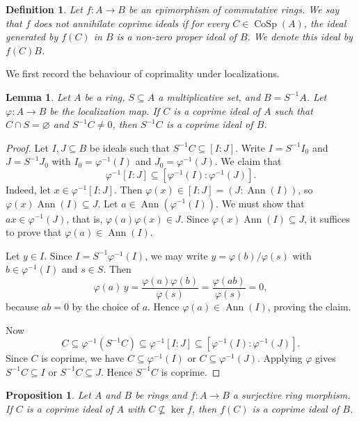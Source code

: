 \documentclass{amsart}
\newtheorem{lemma}{Lemma}
\newtheorem{proposition}{Proposition}
\newtheorem{definition}{Definition}
\DeclareMathOperator{\ann}{Ann}
\begin{document}
\begin{definition}\label{def:non-annihilating-epi}
Let $f\colon A\to B$ be an epimorphism of commutative rings. We say that $f$ \emph{does not annihilate coprime ideals} if for every $C\in\operatorname{CoSp}(A)$, the ideal generated by $f(C)$ in $B$ is a non-zero proper ideal of $B$. We denote this ideal by $f(C)B$.
\end{definition}

 

We first record the behaviour of coprimality under localizations.

\begin{lemma}\label{lem:localization-coprime}
Let $A$ be a ring, $S\subseteq A$ a multiplicative set, and $B=S^{-1}A$. Let $\varphi\colon A\to B$ be the localization map. If $C$ is a coprime ideal of $A$ such that $C\cap S=\varnothing$ and $S^{-1}C\neq 0$, then $S^{-1}C$ is a coprime ideal of $B$.
\end{lemma}

\begin{proof}
Let $I,J\subseteq B$ be ideals such that $S^{-1}C\subseteq [I:J]$. Write $I=S^{-1}I_0$ and $J=S^{-1}J_0$ with $I_0=\varphi^{-1}(I)$ and $J_0=\varphi^{-1}(J)$. We claim that
\[
\varphi^{-1}[I:J]\subseteq [\varphi^{-1}(I):\varphi^{-1}(J)].
\]
Indeed, let $x\in \varphi^{-1}[I:J]$. Then $\varphi(x)\in [I:J]=(J:\ann(I))$, so $\varphi(x)\ann(I)\subseteq J$. Let $a\in \ann(\varphi^{-1}(I))$. We must show that $ax\in \varphi^{-1}(J)$, that is, $\varphi(a)\varphi(x)\in J$. Since $\varphi(x)\ann(I)\subseteq J$, it suffices to prove that $\varphi(a)\in \ann(I)$.

Let $y\in I$. Since $I=S^{-1}\varphi^{-1}(I)$, we may write $y=\varphi(b)/\varphi(s)$ with $b\in \varphi^{-1}(I)$ and $s\in S$. Then
\[
\varphi(a)\,y=\frac{\varphi(a)\varphi(b)}{\varphi(s)}=\frac{\varphi(ab)}{\varphi(s)}=0,
\]
because $ab=0$ by the choice of $a$. Hence $\varphi(a)\in \ann(I)$, proving the claim.

Now
\[
C\subseteq \varphi^{-1}(S^{-1}C)\subseteq \varphi^{-1}[I:J]\subseteq [\varphi^{-1}(I):\varphi^{-1}(J)].
\]
Since $C$ is coprime, we have $C\subseteq \varphi^{-1}(I)$ or $C\subseteq \varphi^{-1}(J)$. Applying $\varphi$ gives $S^{-1}C\subseteq I$ or $S^{-1}C\subseteq J$. Hence $S^{-1}C$ is coprime.
\end{proof}

\begin{proposition}\label{prop:image-coprime-surjective}
Let $A$ and $B$ be rings and $f\colon A\to B$ a surjective ring morphism. If $C$ is a coprime ideal of $A$ with $C\nsubseteq \ker f$, then $f(C)$ is a coprime ideal of $B$.
\end{proposition}
\end{document}
